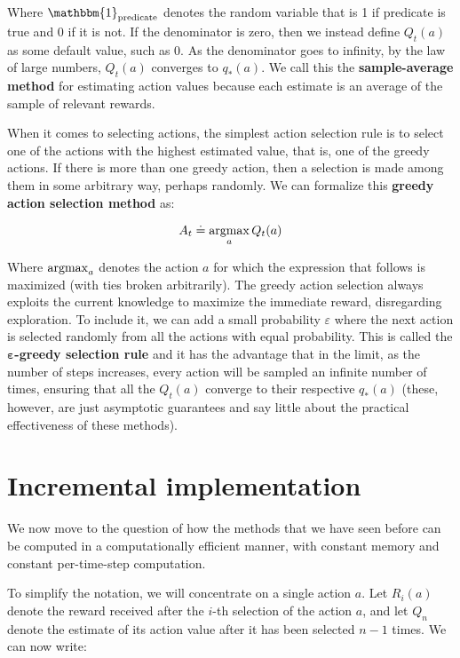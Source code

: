 Where $\mathbbm{1}_{\text{predicate}}$ denotes the random variable that is 1 if predicate is true and 0 if it is not. If the denominator is zero, then we instead define $Q_t(a)$  as some default value, such as 0. As the denominator goes to infinity, by the law of large numbers, $Q_t(a)$ converges to $q_*(a)$. We call this the \textbf{sample-average method} for estimating action values because each estimate is an average of the sample of relevant rewards.

When it comes to selecting actions, the simplest action selection rule is to select one of the actions with the highest estimated value, that is, one of the greedy actions. If there is more than one greedy action, then a selection is made among them in some arbitrary way, perhaps randomly. We can formalize this \textbf{greedy action selection method} as:

\begin{equation}
    A_t \doteq \operatorname*{argmax}_a  Q_t(a)
    \label{eq:ch3-greedyactionselectionmethod}
\end{equation}

Where $\operatorname*{argmax}_a$ denotes the action $a$ for which the expression that follows is maximized (with ties broken arbitrarily). The greedy action selection always exploits the current knowledge to maximize the immediate reward, disregarding exploration. To include it, we can add a small probability $\varepsilon$ where the next action is selected randomly from all the actions with equal probability. This is called the \textbf{$\boldsymbol{\varepsilon}$-greedy selection rule} and it has the advantage that in the limit, as the number of steps increases, every action will be sampled an infinite number of times, ensuring that all the $Q_t(a)$ converge to their respective $q_*(a)$ (these, however, are just asymptotic guarantees and say little about the practical effectiveness of these methods).

\section{Incremental implementation}
We now move to the question of how the methods that we have seen before can be computed in a computationally efficient manner, with constant memory and constant per-time-step computation.

To simplify the notation, we will concentrate on a single action $a$. Let $R_i(a)$ denote the reward received after the $i$-th selection of the action $a$, and let $Q_n$ denote the estimate of its action value after it has been selected $n-1$ times. We can now write:

